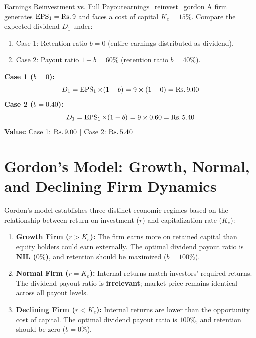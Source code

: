 \begin{example}{Earnings Reinvestment vs. Full Payout}{earnings_reinvest_gordon}
A firm generates $\operatorname{EPS}_1 = \text{Rs.}\, 9$ and faces a cost of capital $K_e = 15\%$. Compare the expected dividend $D_1$ under:
\begin{enumerate}[noitemsep, leftmargin=*]
    \item Case 1: Retention ratio $b = 0$ (entire earnings distributed as dividend).
    \item Case 2: Payout ratio $1 - b = 60\%$ (retention ratio $b = 40\%$).
\end{enumerate}
\tcblower
\textbf{Case 1 ($b = 0$):}
\begin{equation*}
    D_1 = \operatorname{EPS}_1 \times (1 - b) = 9 \times (1 - 0) = \text{Rs.}\, 9.00
\end{equation*}
\textbf{Case 2 ($b = 0.40$):}
\begin{equation*}
    D_1 = \operatorname{EPS}_1 \times (1 - b) = 9 \times 0.60 = \text{Rs.}\, 5.40
\end{equation*}
\textbf{Value:} Case 1: $\text{Rs.}\, 9.00$ \quad | \quad Case 2: $\text{Rs.}\, 5.40$
\end{example}

\section{Gordon's Model: Growth, Normal, and Declining Firm Dynamics}

\begin{formulabox}
Gordon's model establishes three distinct economic regimes based on the relationship between return on investment ($r$) and capitalization rate ($K_e$):
\begin{enumerate}[leftmargin=*, noitemsep]
    \item \textbf{Growth Firm ($r > K_e$):} The firm earns more on retained capital than equity holders could earn externally. The optimal dividend payout ratio is \textbf{NIL ($0\%$)}, and retention should be maximized ($b = 100\%$).
    \item \textbf{Normal Firm ($r = K_e$):} Internal returns match investors' required returns. The dividend payout ratio is \textbf{irrelevant}; market price remains identical across all payout levels.
    \item \textbf{Declining Firm ($r < K_e$):} Internal returns are lower than the opportunity cost of capital. The optimal dividend payout ratio is \textbf{$100\%$}, and retention should be zero ($b = 0\%$).
\end{enumerate}
\end{formulabox}

